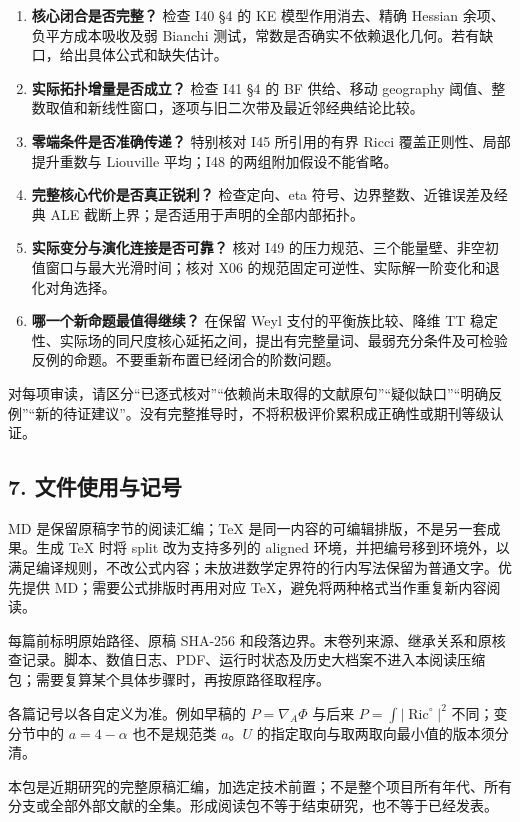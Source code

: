\documentclass[
  10pt,
]{article}
\providecommand{\tightlist}{%
  \setlength{\itemsep}{0pt}\setlength{\parskip}{0pt}}
\begin{document}
\begin{enumerate}
\def\labelenumi{\arabic{enumi}.}
\tightlist
\item
  \textbf{核心闭合是否完整？} 检查 I40 §4 的 KE 模型作用消去、精确
  Hessian 余项、负平方成本吸收及弱 Bianchi
  测试，常数是否确实不依赖退化几何。若有缺口，给出具体公式和缺失估计。
\item
  \textbf{实际拓扑增量是否成立？} 检查 I41 §4 的 BF 供给、移动 geography
  阈值、整数取值和新线性窗口，逐项与旧二次带及最近邻经典结论比较。
\item
  \textbf{零端条件是否准确传递？} 特别核对 I45 所引用的有界 Ricci
  覆盖正则性、局部提升重数与 Liouville 平均；I48
  的两组附加假设不能省略。
\item
  \textbf{完整核心代价是否真正锐利？} 检查定向、eta
  符号、边界整数、近锥误差及经典 ALE
  截断上界；是否适用于声明的全部内部拓扑。
\item
  \textbf{实际变分与演化连接是否可靠？} 核对 I49
  的压力规范、三个能量壁、非空初值窗口与最大光滑时间；核对 X06
  的规范固定可逆性、实际解一阶变化和退化对角选择。
\item
  \textbf{哪一个新命题最值得继续？} 在保留 Weyl 支付的平衡族比较、降维
  TT
  稳定性、实际场的同尺度核心延拓之间，提出有完整量词、最弱充分条件及可检验反例的命题。不要重新布置已经闭合的阶数问题。
\end{enumerate}

对每项审读，请区分``已逐式核对''``依赖尚未取得的文献原句''``疑似缺口''``明确反例''``新的待证建议''。没有完整推导时，不将积极评价累积成正确性或期刊等级认证。

\hypertarget{ux6587ux4ef6ux4f7fux7528ux4e0eux8bb0ux53f7}{%
\subsection{7.
文件使用与记号}\label{ux6587ux4ef6ux4f7fux7528ux4e0eux8bb0ux53f7}}

MD 是保留原稿字节的阅读汇编；TeX
是同一内容的可编辑排版，不是另一套成果。生成 TeX 时将 split
改为支持多列的 aligned
环境，并把编号移到环境外，以满足编译规则，不改公式内容；未放进数学定界符的行内写法保留为普通文字。优先提供
MD；需要公式排版时再用对应 TeX，避免将两种格式当作重复新内容阅读。

每篇前标明原始路径、原稿 SHA-256
和段落边界。末卷列来源、继承关系和原核查记录。脚本、数值日志、PDF、运行时状态及历史大档案不进入本阅读压缩包；需要复算某个具体步骤时，再按原路径取程序。

各篇记号以各自定义为准。例如早稿的 \(P=\nabla_A\Phi\) 与后来
\(P=\int|\operatorname{Ric}^{\circ}|^2\) 不同；变分节中的 \(a=4-\alpha\)
也不是规范类 \(a\)。\(U\) 的指定取向与取两取向最小值的版本须分清。

本包是近期研究的完整原稿汇编，加选定技术前置；不是整个项目所有年代、所有分支或全部外部文献的全集。形成阅读包不等于结束研究，也不等于已经发表。
\end{document}
